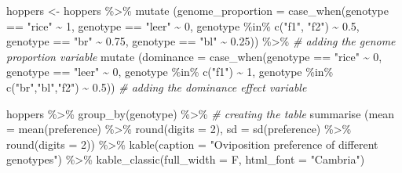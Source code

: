 \documentclass[
]{article}
\newenvironment{Shaded}{\begin{snugshade}}{\end{snugshade}}
\newcommand{\AttributeTok}[1]{\textcolor[rgb]{0.77,0.63,0.00}{#1}}
\newcommand{\CommentTok}[1]{\textcolor[rgb]{0.56,0.35,0.01}{\textit{#1}}}
\newcommand{\DecValTok}[1]{\textcolor[rgb]{0.00,0.00,0.81}{#1}}
\newcommand{\FloatTok}[1]{\textcolor[rgb]{0.00,0.00,0.81}{#1}}
\newcommand{\FunctionTok}[1]{\textcolor[rgb]{0.00,0.00,0.00}{#1}}
\newcommand{\NormalTok}[1]{#1}
\newcommand{\OtherTok}[1]{\textcolor[rgb]{0.56,0.35,0.01}{#1}}
\newcommand{\SpecialCharTok}[1]{\textcolor[rgb]{0.00,0.00,0.00}{#1}}
\newcommand{\StringTok}[1]{\textcolor[rgb]{0.31,0.60,0.02}{#1}}
\begin{document}
\begin{Shaded}
\begin{Highlighting}[]
\NormalTok{hoppers }\OtherTok{\textless{}{-}}\NormalTok{ hoppers }\SpecialCharTok{\%\textgreater{}\%} \FunctionTok{mutate}\NormalTok{ (}\AttributeTok{genome\_proportion =} \FunctionTok{case\_when}\NormalTok{(genotype }\SpecialCharTok{==} \StringTok{"rice"} \SpecialCharTok{\textasciitilde{}} \DecValTok{1}\NormalTok{,}
\NormalTok{                                                             genotype }\SpecialCharTok{==} \StringTok{"leer"} \SpecialCharTok{\textasciitilde{}} \DecValTok{0}\NormalTok{, }
\NormalTok{                                                             genotype }\SpecialCharTok{\%in\%} \FunctionTok{c}\NormalTok{(}\StringTok{"f1"}\NormalTok{, }\StringTok{"f2"}\NormalTok{) }\SpecialCharTok{\textasciitilde{}} \FloatTok{0.5}\NormalTok{,}
\NormalTok{                                                             genotype }\SpecialCharTok{==} \StringTok{"br"} \SpecialCharTok{\textasciitilde{}} \FloatTok{0.75}\NormalTok{,}
\NormalTok{                                                             genotype }\SpecialCharTok{==} \StringTok{"bl"} \SpecialCharTok{\textasciitilde{}} \FloatTok{0.25}\NormalTok{)) }\SpecialCharTok{\%\textgreater{}\%} \CommentTok{\# adding the genome proportion variable}
  \FunctionTok{mutate}\NormalTok{ (}\AttributeTok{dominance =} \FunctionTok{case\_when}\NormalTok{(genotype }\SpecialCharTok{==} \StringTok{"rice"} \SpecialCharTok{\textasciitilde{}} \DecValTok{0}\NormalTok{,}
\NormalTok{                                genotype }\SpecialCharTok{==} \StringTok{"leer"} \SpecialCharTok{\textasciitilde{}} \DecValTok{0}\NormalTok{, }
\NormalTok{                                genotype }\SpecialCharTok{\%in\%} \FunctionTok{c}\NormalTok{(}\StringTok{"f1"}\NormalTok{) }\SpecialCharTok{\textasciitilde{}} \DecValTok{1}\NormalTok{,}
\NormalTok{                                genotype }\SpecialCharTok{\%in\%} \FunctionTok{c}\NormalTok{(}\StringTok{"br"}\NormalTok{,}\StringTok{"bl"}\NormalTok{,}\StringTok{"f2"}\NormalTok{) }\SpecialCharTok{\textasciitilde{}} \FloatTok{0.5}\NormalTok{)) }\CommentTok{\# adding the dominance effect variable}

\NormalTok{hoppers }\SpecialCharTok{\%\textgreater{}\%} \FunctionTok{group\_by}\NormalTok{(genotype) }\SpecialCharTok{\%\textgreater{}\%} \CommentTok{\# creating the table}
  \FunctionTok{summarise}\NormalTok{ (}\AttributeTok{mean =} \FunctionTok{mean}\NormalTok{(preference) }\SpecialCharTok{\%\textgreater{}\%} \FunctionTok{round}\NormalTok{(}\AttributeTok{digits =} \DecValTok{2}\NormalTok{), }\AttributeTok{sd =} \FunctionTok{sd}\NormalTok{(preference) }\SpecialCharTok{\%\textgreater{}\%} \FunctionTok{round}\NormalTok{(}\AttributeTok{digits =} \DecValTok{2}\NormalTok{)) }\SpecialCharTok{\%\textgreater{}\%} 
  \FunctionTok{kable}\NormalTok{(}\AttributeTok{caption =} \StringTok{"Oviposition preference of different genotypes"}\NormalTok{) }\SpecialCharTok{\%\textgreater{}\%} 
  \FunctionTok{kable\_classic}\NormalTok{(}\AttributeTok{full\_width =}\NormalTok{ F, }\AttributeTok{html\_font =} \StringTok{"Cambria"}\NormalTok{)}
\end{Highlighting}
\end{Shaded}
\end{document}
